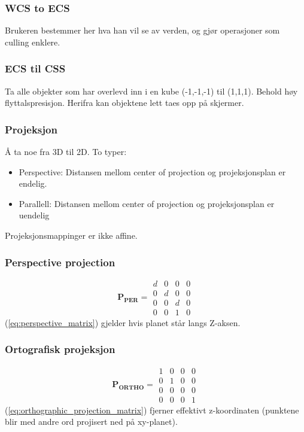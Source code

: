 \subsubsection{WCS to ECS}
Brukeren bestemmer her hva han vil se av verden, og gjør operasjoner som culling enklere.
\subsubsection{ECS til CSS}
Ta alle objekter som har overlevd inn i en kube (-1,-1,-1) til (1,1,1). Behold høy flyttalspresisjon. Herifra kan objektene lett taes opp på skjermer.

\subsubsection{Projeksjon}
Å ta noe fra 3D til 2D. To typer:
\begin{itemize}
    \item Perspective: Distansen mellom center of projection og projeksjonsplan er endelig.
    \item Parallell: Distansen mellom center of projection og projeksjonsplan er uendelig
\end{itemize}
Projeksjonsmappinger er ikke affine.

\subsubsection{Perspective projection}
\begin{equation} \label{eq:perspective_matrix}
    \boldsymbol{P_{PER}} =
    \begin{matrix}
        d & 0 & 0 & 0 \\
        0 & d & 0 & 0 \\
        0 & 0 & d & 0 \\
        0 & 0 & 1 & 0
    \end{matrix}
\end{equation}
(\ref{eq:perspective_matrix}) gjelder hvis planet står langs Z-aksen.

\subsubsection{Ortografisk projeksjon}
\begin{equation} \label{eq:orthographic_projection_matrix}
    \boldsymbol{P_{ORTHO}} =
    \begin{matrix}
        1 & 0 & 0 & 0 \\
        0 & 1 & 0 & 0 \\
        0 & 0 & 0 & 0 \\
        0 & 0 & 0 & 1
    \end{matrix}
\end{equation}
(\ref{eq:orthographic_projection_matrix}) fjerner effektivt z-koordinaten (punktene blir med andre ord projisert ned på xy-planet).


